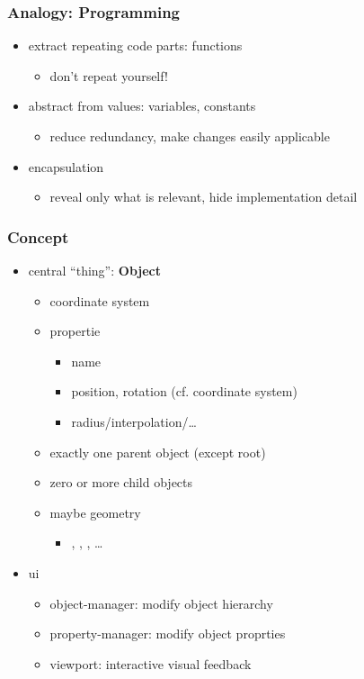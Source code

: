 \documentclass{beamer}
\begin{document}
  \begin{frame}[t]\frametitle{Analogy: Programming}
    \begin{itemize}
      \item extract repeating code parts: functions
      \begin{itemize}
        \item don't repeat yourself!
      \end{itemize}
      \item abstract from values: variables, constants
      \begin{itemize}
        \item reduce redundancy, make changes easily applicable
      \end{itemize}
      \item encapsulation
      \begin{itemize}
        \item reveal only what is relevant, hide implementation detail
      \end{itemize}
    \end{itemize} 
  \end{frame}

  \begin{frame}[t]\frametitle{Concept}
    \begin{itemize}
      \item central ``thing'': \textbf{Object}
      \begin{itemize}
        \item coordinate system
        \item propertie
        \begin{itemize}
          \item name
          \item position, rotation (cf. coordinate system)
          \item radius/interpolation/\dots
        \end{itemize}
        \item exactly one parent object (except root)
        \item zero or more child objects
        \item maybe geometry
        \begin{itemize}
          \item {}, , , \dots
        \end{itemize}
      \end{itemize}
    \item ui
      \begin{itemize}
        \item object-manager: modify object hierarchy
        \item property-manager: modify object proprties
        \item viewport: interactive visual feedback
      \end{itemize}
    \end{itemize}
  \end{frame}
\end{document}
